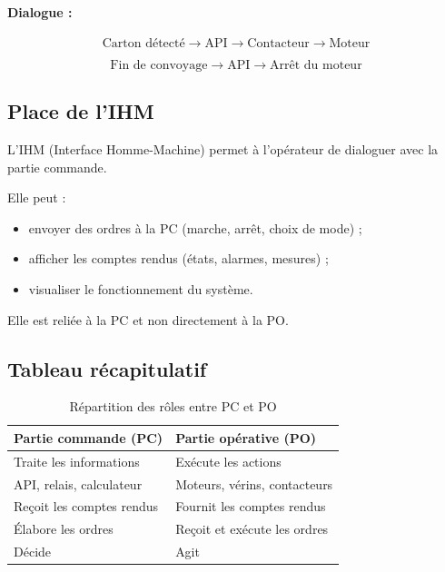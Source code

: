 \paragraph{Dialogue :}

\[
\text{Carton détecté} \rightarrow \text{API} \rightarrow \text{Contacteur} \rightarrow \text{Moteur}
\]

\[
\text{Fin de convoyage} \rightarrow \text{API} \rightarrow \text{Arrêt du moteur}
\]

\subsection{Place de l'IHM}

L'IHM (Interface Homme-Machine) permet à l'opérateur de dialoguer avec la partie commande.

Elle peut :

\begin{itemize}
    \item envoyer des ordres à la PC (marche, arrêt, choix de mode) ;
    \item afficher les comptes rendus (états, alarmes, mesures) ;
    \item visualiser le fonctionnement du système.
\end{itemize}

Elle est reliée à la PC et non directement à la PO.

\subsection{Tableau récapitulatif}

\begin{table}[h]
\centering
\begin{tabularx}{\textwidth}{|X|X|}
\hline
\textbf{Partie commande (PC)} & \textbf{Partie opérative (PO)} \\
\hline
Traite les informations & Exécute les actions \\
\hline
API, relais, calculateur & Moteurs, vérins, contacteurs \\
\hline
Reçoit les comptes rendus & Fournit les comptes rendus \\
\hline
Élabore les ordres & Reçoit et exécute les ordres \\
\hline
Décide & Agit \\
\hline
\end{tabularx}
\caption{Répartition des rôles entre PC et PO}
\end{table}

